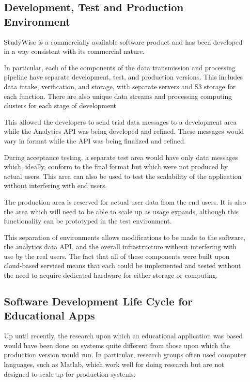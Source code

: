 \documentclass[runningheads,a4paper]{llncs}
\begin{document}
\subsection{Development, Test and Production Environment}

StudyWise is a commercially available software product and has been developed in a way consistent with its commercial nature.

In particular, each of the components of the data transmission and processing pipeline have separate development, test, and production versions.  This includes data intake, verification, and storage, with separate servers and S3 storage for each function.  There are also unique data streams and processing computing clusters for each stage of development

This allowed the developers to send trial data messages to a development area while the Analytics API was being developed and refined.  These messages would vary in format while the API was being finalized and refined.  

During acceptance testing, a separate test area would have only data messages which, ideally, conform to the final format but which were not produced by actual users.  This area can also be used to test the scalability of the application without interfering with end users.

The production area is reserved for actual user data from the end users.  It is also the area which will need to be able to scale up as usage expands, although this functionality can be prototyped in the test environment.

This separation of environments allows modifications to be made to the software, the analytics data API, and the overall infrastructure without interfering with use by the real users.  The fact that all of these components were built upon cloud-based serviced means that each could be implemented and tested without the need to acquire dedicated hardware for either storage or computing.

\subsection{Software Development Life Cycle for Educational Apps}

Up until recently, the research upon which an educational application was based would have been done on systems quite different from those upon which the production version would run.  In particular, research groups often used computer languages, such as Matlab, which work well for doing research but are not designed to scale up for production systems.
\end{document}
